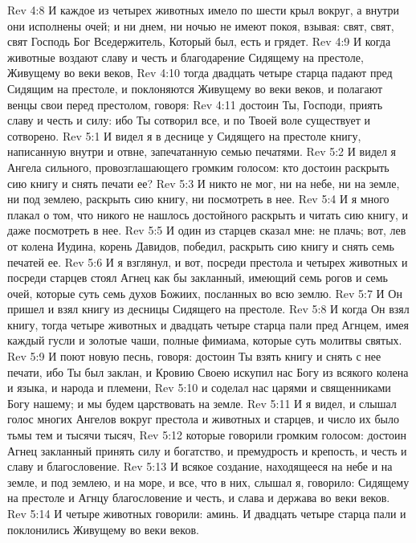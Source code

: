 \vs Rev 4:8 И каждое из четырех животных имело по шести крыл вокруг, а внутри они исполнены очей; и ни днем, ни ночью не имеют покоя, взывая: свят, свят, свят Господь Бог Вседержитель, Который был, есть и грядет.
\vs Rev 4:9 И когда животные воздают славу и честь и благодарение Сидящему на престоле, Живущему во веки веков,
\vs Rev 4:10 тогда двадцать четыре старца падают пред Сидящим на престоле, и поклоняются Живущему во веки веков, и полагают венцы свои перед престолом, говоря:
\vs Rev 4:11 достоин Ты, Господи, приять славу и честь и силу: ибо Ты сотворил все, и  по Твоей воле существует и сотворено.
\vs Rev 5:1 И видел я в деснице у Сидящего на престоле книгу, написанную внутри и отвне, запечатанную семью печатями.
\vs Rev 5:2 И видел я Ангела сильного, провозглашающего громким голосом: кто достоин раскрыть сию книгу и снять печати ее?
\vs Rev 5:3 И никто не мог, ни на небе, ни на земле, ни под землею, раскрыть сию книгу, ни посмотреть в нее.
\vs Rev 5:4 И я много плакал о том, что никого не нашлось достойного раскрыть и читать сию книгу, и даже посмотреть в нее.
\vs Rev 5:5 И один из старцев сказал мне: не плачь; вот, лев от колена Иудина, корень Давидов, победил,  раскрыть сию книгу и снять семь печатей ее.
\vs Rev 5:6 И я взглянул, и вот, посреди престола и четырех животных и посреди старцев стоял Агнец как бы закланный, имеющий семь рогов и семь очей, которые суть семь духов Божиих, посланных во всю землю.
\vs Rev 5:7 И Он пришел и взял книгу из десницы Сидящего на престоле.
\vs Rev 5:8 И когда Он взял книгу, тогда четыре животных и двадцать четыре старца пали пред Агнцем, имея каждый гусли и золотые чаши, полные фимиама, которые суть молитвы святых.
\vs Rev 5:9 И поют новую песнь, говоря: достоин Ты взять книгу и снять с нее печати, ибо Ты был заклан, и Кровию Своею искупил нас Богу из всякого колена и языка, и народа и племени,
\vs Rev 5:10 и соделал нас царями и священниками Богу нашему; и мы будем царствовать на земле.
\vs Rev 5:11 И я видел, и слышал голос многих Ангелов вокруг престола и животных и старцев, и число их было тьмы тем и тысячи тысяч,
\vs Rev 5:12 которые говорили громким голосом: достоин Агнец закланный принять силу и богатство, и премудрость и крепость, и честь и славу и благословение.
\vs Rev 5:13 И всякое создание, находящееся на небе и на земле, и под землею, и на море, и все, что в них, слышал я, говорило: Сидящему на престоле и Агнцу благословение и честь, и слава и держава во веки веков.
\vs Rev 5:14 И четыре животных говорили: аминь. И двадцать четыре старца пали и поклонились Живущему во веки веков.
